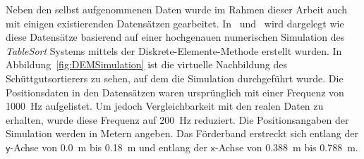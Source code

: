 
Neben den selbst aufgenommenen Daten wurde im Rahmen dieser Arbeit auch mit einigen existierenden Datensätzen gearbeitet.
In \cite{pieper2016numerical}~und~\cite{pieper2017numerical} wird dargelegt wie diese Datensätze basierend auf einer hochgenauen numerischen Simulation des \textit{TableSort} Systems mittels der Diskrete-Elemente-Methode erstellt wurden.
In Abbildung~\ref{fig:DEMSimulation} ist die virtuelle Nachbildung des Schüttgutsortierers zu sehen, auf dem die Simulation durchgeführt wurde.
Die Positionsdaten in den Datensätzen waren ursprünglich mit einer Frequenz von \SI{1000}{\hertz} aufgelistet.
Um jedoch Vergleichbarkeit mit den realen Daten zu erhalten, wurde diese Frequenz auf \SI{200}{\hertz} reduziert.
Die Positionsangaben der Simulation werden in Metern angeben.
Das Förderband erstreckt sich entlang der \(\mathsf{y}\)-Achse von \SI{0.0}{\meter} bis \SI{0.18}{\meter} und entlang der \(\mathsf{x}\)-Achse von \SI{0.388}{\meter} bis \SI{0.788}{\meter}.

